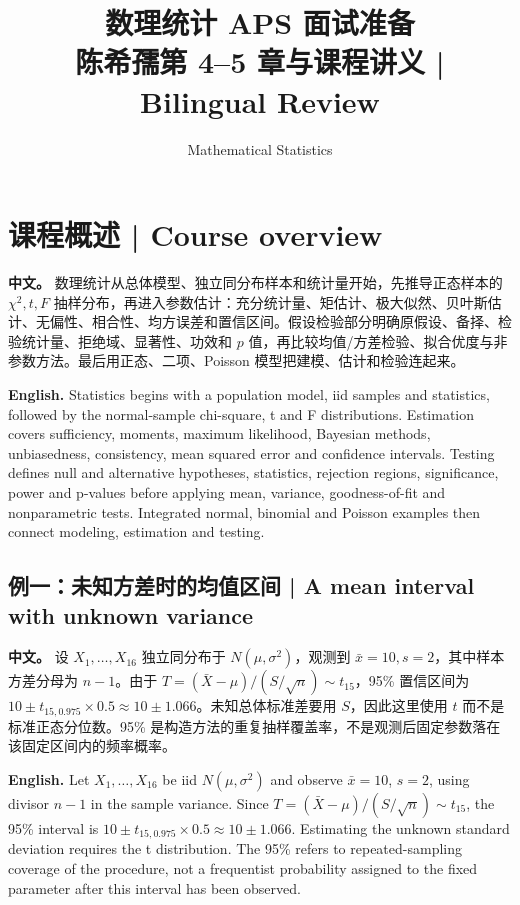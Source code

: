 \documentclass[UTF8,11pt,a4paper]{ctexart}
\title{数理统计 APS 面试准备\\[4pt]\large 陈希孺第 4--5 章与课程讲义 | Bilingual Review}
\author{Mathematical Statistics}
\date{}
\newcommand{\APS}[2]{\par\noindent\textbf{中文。} #1\par\noindent\textbf{English.} #2\par\smallskip}
\begin{document}
\maketitle

\section*{课程概述 | Course overview}
\APS{数理统计从总体模型、独立同分布样本和统计量开始，先推导正态样本的 $\chi^2,t,F$ 抽样分布，再进入参数估计：充分统计量、矩估计、极大似然、贝叶斯估计、无偏性、相合性、均方误差和置信区间。假设检验部分明确原假设、备择、检验统计量、拒绝域、显著性、功效和 $p$ 值，再比较均值/方差检验、拟合优度与非参数方法。最后用正态、二项、Poisson 模型把建模、估计和检验连起来。}{Statistics begins with a population model, iid samples and statistics, followed by the normal-sample chi-square, t and F distributions. Estimation covers sufficiency, moments, maximum likelihood, Bayesian methods, unbiasedness, consistency, mean squared error and confidence intervals. Testing defines null and alternative hypotheses, statistics, rejection regions, significance, power and p-values before applying mean, variance, goodness-of-fit and nonparametric tests. Integrated normal, binomial and Poisson examples then connect modeling, estimation and testing.}
\subsection*{例一：未知方差时的均值区间 | A mean interval with unknown variance}
\APS{设 $X_1,\ldots,X_{16}$ 独立同分布于 $N(\mu,\sigma^2)$，观测到 $\bar x=10,s=2$，其中样本方差分母为 $n-1$。由于 $T=(\bar X-\mu)/(S/\sqrt n)\sim t_{15}$，95\% 置信区间为 $10\pm t_{15,0.975}\times0.5\approx10\pm1.066$。未知总体标准差要用 $S$，因此这里使用 $t$ 而不是标准正态分位数。95\% 是构造方法的重复抽样覆盖率，不是观测后固定参数落在该固定区间内的频率概率。}{Let $X_1,\ldots,X_{16}$ be iid $N(\mu,\sigma^2)$ and observe $\bar x=10$, $s=2$, using divisor $n-1$ in the sample variance. Since $T=(\bar X-\mu)/(S/\sqrt n)\sim t_{15}$, the 95\% interval is $10\pm t_{15,0.975}\times0.5\approx10\pm1.066$. Estimating the unknown standard deviation requires the t distribution. The 95\% refers to repeated-sampling coverage of the procedure, not a frequentist probability assigned to the fixed parameter after this interval has been observed.}
\end{document}
